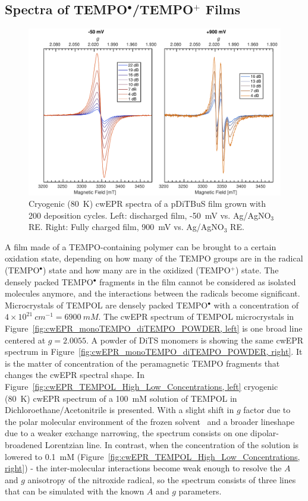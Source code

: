 \subsection{Spectra of TEMPO$^{\bullet}$/TEMPO$^{+}$ Films}
\begin{figure}[h]
\center
	\includegraphics[width=1\textwidth]{./operando_epr/figures/CRYO/S220104_CW.pdf}
	\caption{Cryogenic (80~K) cwEPR spectra of a pDiTBuS film grown with 200 deposition cycles. Left: discharged film, -50~mV vs. Ag/AgNO$_3$ RE. Right: Fully charged film, 900~mV vs. Ag/AgNO$_3$ RE.}
	\label{fig:cwEPR_CRYO_DiTBuS_DCG_vs_CHG}
\end{figure}
A film made of a TEMPO-containing polymer can be brought to a certain oxidation state, depending on how many of the TEMPO groups are in the radical (TEMPO$^{\bullet}$) state and how many are in the oxidized (TEMPO$^{+}$) state. The densely packed TEMPO$^{\bullet}$ fragments in the film cannot be considered as isolated molecules anymore, and the interactions between the radicals become significant. Microcrystals of TEMPOL are densely packed TEMPO$^{\bullet}$ with a concentration of $4\times10^{21}~cm^{-1}=6900~mM$. The cwEPR spectrum of TEMPOL microcrystals in Figure~\ref{fig:cwEPR_monoTEMPO_diTEMPO_POWDER, left} is one broad line centered at $g=2.0055$. A powder of DiTS monomers is showing the same cwEPR spectrum in Figure~\ref{fig:cwEPR_monoTEMPO_diTEMPO_POWDER, right}. It is the matter of concentration of the peramagnetic TEMPO fragments that changes the cwEPR spectral shape. In Figure~\ref{fig:cwEPR_TEMPOL_High_Low_Concentrations, left} cryogenic (80~K) cwEPR spectrum of a 100~mM solution of TEMPOL in Dichloroethane/Acetonitrile is presented. With a slight shift in $g$ factor due to the polar molecular environment of the frozen solvent~\cite{Siavash} and a broader lineshape due to a weaker exchange narrowing, the spectrum consists on one dipolar-broadened Lorentzian line. In contrast, when the concentration of the solution is lowered to 0.1~mM (Figure~\ref{fig:cwEPR_TEMPOL_High_Low_Concentrations, right}) - the inter-molecular interactions become weak enough to resolve the $A$ and $g$ anisotropy of the nitroxide radical, so the spectrum consists of three lines that can be simulated with the known $A$ and $g$ parameters.\\
